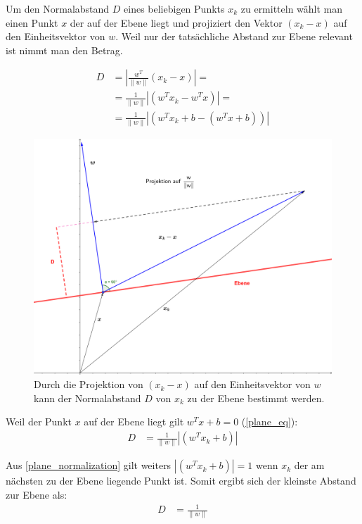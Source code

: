 \documentclass[a4paper,11pt,twoside]{scrreprt}
\begin{document}
Um den Normalabstand $D$ eines beliebigen Punkts $x_{k}$ zu ermitteln wählt man einen Punkt $x$ der auf der Ebene liegt und projiziert den Vektor $(x_{k} - x)$ auf den Einheitsvektor von $w$. Weil nur der tatsächliche Abstand zur Ebene relevant ist nimmt man den Betrag.

\begin{equation} \label{distance_to_plane}
	\begin{aligned}
		D &= | \frac{w^{T}}{\lVert w \rVert} (x_{k} - x) | = \\
		&= \frac{1}{\lVert w \rVert} | (w^{T} x_{k} - w^{T} x) | =\\
		&= \frac{1}{\lVert w \rVert} | (w^{T} x_{k} + b - (w^{T} x + b)) |
	\end{aligned}
\end{equation}

\begin{figure}[H]
	\centering
	\includegraphics{assets/projection.png}
	\caption{Durch die Projektion von $(x_{k} - x)$ auf den Einheitsvektor von $w$ kann der Normalabstand $D$ von $x_{k}$ zu der Ebene bestimmt werden.}
	\label{fig:projection}
\end{figure}

Weil der Punkt $x$ auf der Ebene liegt gilt $w^{T} x + b = 0$ (\autoref{plane_eq}):
\begin{equation} \label{distance_to_plane_simplified1}
	\begin{aligned}
		D &= \frac{1}{\lVert w \rVert} | (w^{T} x_{k} + b) |
	\end{aligned}
\end{equation}

Aus \autoref{plane_normalization} gilt weiters $| (w^{T} x_{k} + b) | = 1$ wenn $x_{k}$ der am nächsten zu der Ebene liegende Punkt ist. Somit ergibt sich der kleinste Abstand zur Ebene als:
\begin{equation} \label{distance_to_plane_simplified2}
	\begin{aligned}
		D &= \frac{1}{\lVert w \rVert}
	\end{aligned}
\end{equation}



\clearpage
{}
{}
\printbibliography
\end{document}
